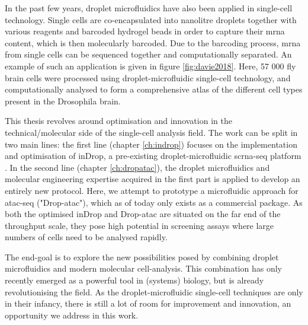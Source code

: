 In the past few years, droplet microfluidics have also been applied in single-cell technology. Single cells are co-encapsulated into nanolitre droplets together with various reagents and barcoded hydrogel beads in order to capture their \acrshort{mrna} content, which is then molecularly barcoded. Due to the barcoding process, \acrshort{mrna} from single cells can be sequenced together and computationally separated. An example of such an application is given in figure \ref{fig:davie2018}. Here, 57 000 fly brain cells were processed using droplet-microfluidic single-cell technology, and computationally analysed to form a comprehensive atlas of the different cell types present in the Drosophila brain.\pms

This thesis revolves around optimisation and innovation in the technical/molecular side of the single-cell analysis field. The work can be split in two main lines: the first line (chapter \ref{ch:indrop}) focuses on the implementation and optimisation of inDrop, a pre-existing droplet-microfluidic \acrlong{scrna-seq} platform \citep{klein2015, zilionis2017}. In the second line (chapter \ref{ch:dropatac}), the droplet microfluidics and molecular engineering expertise acquired in the first part is applied to develop an entirely new protocol. Here, we attempt to prototype a microfluidic approach for \acrshort{atac-seq} ("Drop-\acrshort{atac}"), which as of today only exists as a commercial package. As both the optimised inDrop and Drop-\acrshort{atac} are situated on the far end of the throughput scale, they pose high potential in screening assays where large numbers of cells need to be analysed rapidly.\pms

The end-goal is to explore the new possibilities posed by combining droplet microfluidics and modern molecular cell-analysis. This combination has only recently emerged as a powerful tool in (systems) biology, but is already revolutionising the field. As the droplet-microfluidic single-cell techniques are only in their infancy, there is still a lot of room for improvement and innovation, an opportunity we address in this work.\pms
